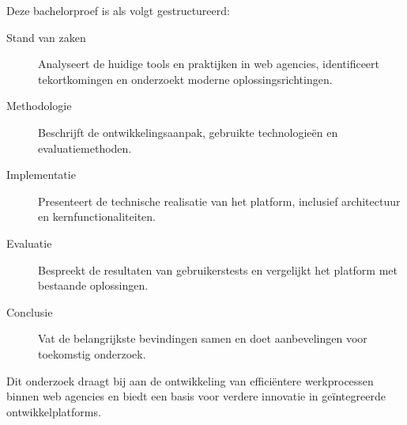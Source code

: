 Deze bachelorproef is als volgt gestructureerd:

\begin{description}
    \item[Stand van zaken] Analyseert de huidige tools en praktijken in web agencies, identificeert tekortkomingen en onderzoekt moderne oplossingsrichtingen.
    
    \item[Methodologie] Beschrijft de ontwikkelingsaanpak, gebruikte technologieën en evaluatiemethoden.
    
    \item[Implementatie] Presenteert de technische realisatie van het platform, inclusief architectuur en kernfunctionaliteiten.
    
    \item[Evaluatie] Bespreekt de resultaten van gebruikerstests en vergelijkt het platform met bestaande oplossingen.
    
    \item[Conclusie] Vat de belangrijkste bevindingen samen en doet aanbevelingen voor toekomstig onderzoek.
\end{description}

Dit onderzoek draagt bij aan de ontwikkeling van efficiëntere werkprocessen binnen web agencies en biedt een basis voor verdere innovatie in geïntegreerde ontwikkelplatforms.